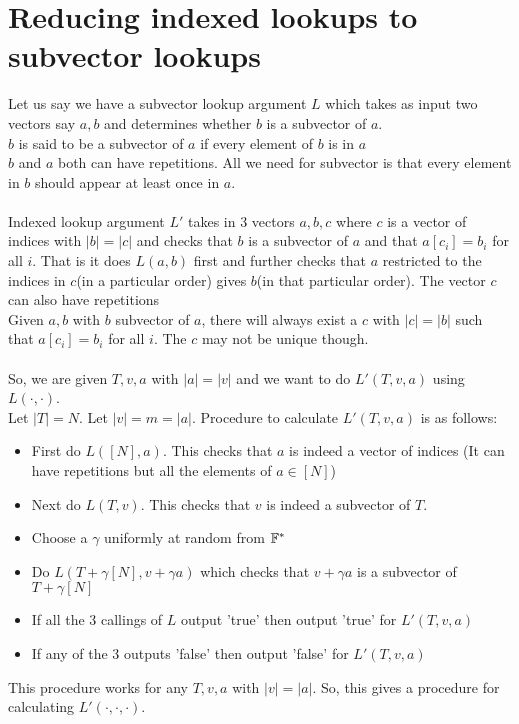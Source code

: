 \section{Reducing indexed lookups to subvector lookups}
Let us say we have a subvector lookup argument $L$ which takes as input two vectors say $a, b$ and determines whether $b$ is a subvector of $a$.\\
$b$ is said to be a subvector of $a$ if every element of $b$ is in $a$\\
$b$ and $a$ both can have repetitions. All we need for subvector is that every element in $b$ should appear at least once in $a$.\\\\



Indexed lookup argument $L'$ takes in 3 vectors $a, b, c$ where $c$ is a vector of indices with $|b|=|c|$ and checks that $b$ is a subvector of $a$ and that $a[c_i]=b_i$ for all $i$. That is it does $L(a, b)$ first and further checks that $a$ restricted to the indices in $c$(in a particular order) gives $b$(in that particular order). The vector $c$ can also have repetitions \\
Given $a,b$ with $b$ subvector of $a$, there will always exist a $c$ with $|c|=|b|$ such that $a[c_i]=b_i$ for all $i$. The $c$ may not be unique though. \\\\
So, we are given $T, v, a$ with $|a|=|v|$ and we want to do $L'(T, v, a)$ using $L(\cdot, \cdot)$. \\
Let $|T|=N$. Let $|v|=m=|a|$.
Procedure to calculate $L'(T, v, a)$ is as follows:
\begin{itemize}
    \item First do $L([N], a)$. This checks that $a$ is indeed a vector of indices (It can have repetitions but all the elements of $a \in [N]$)
    \item Next do $L(T, v)$. This checks that $v$ is indeed a subvector of $T$.
    \item Choose a $\gamma$ uniformly at random from $\mathbb{F}^*$
    \item Do $L(T+\gamma[N], v+\gamma a)$ which checks that $v+\gamma a$ is a subvector of $T+\gamma [N]$
    \item If all the 3 callings of $L$ output 'true' then output 'true' for $L'(T, v, a)$
    \item If any of the 3 outputs 'false' then output 'false' for $L'(T, v, a)$
\end{itemize}
This procedure works for any $T,v,a$ with $|v|=|a|$. So, this gives a procedure for calculating $L'(\cdot, \cdot, \cdot)$.

